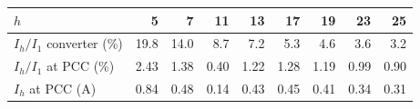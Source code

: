 \begin{tabular}{lrrrrrrrr}
\toprule
$h$ & 5 & 7 & 11 & 13 & 17 & 19 & 23 & 25\\
\midrule
$I_h/I_1$ converter (\%) & 19.8 & 14.0 & 8.7 & 7.2 & 5.3 & 4.6 & 3.6 & 3.2\\
$I_h/I_1$ at PCC (\%) & 2.43 & 1.38 & 0.40 & 1.22 & 1.28 & 1.19 & 0.99 & 0.90\\
$I_h$ at PCC (A) & 0.84 & 0.48 & 0.14 & 0.43 & 0.45 & 0.41 & 0.34 & 0.31\\
\bottomrule
\end{tabular}
